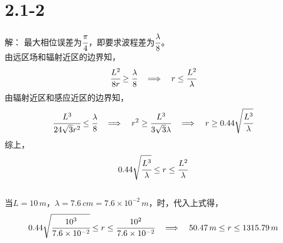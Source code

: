 \documentclass[a4paper,11pt]{article}
\begin{document}
\title{}
\author{\textbf{刘洋} \\ \\ 学号:$201428007326027$ \\
\\$liuyang614@mails.ucas.ac.cn$\\  \\{}}

\date{2015-03-24}
\maketitle

\newpage
\section{2.1-2}
解： 最大相位误差为$\cfrac{\pi}{4}$，即要求波程差为$\cfrac{\lambda}{8}$。\\
由远区场和辐射近区的边界知，
$$\cfrac{L^2}{8r}\geq \cfrac{\lambda}{8}\quad\Longrightarrow \quad  r\leq \cfrac{L^2}{\lambda}$$
由辐射近区和感应近区的边界知，
$$\cfrac{L^3}{24\sqrt{3}r^2}\leq \cfrac{\lambda}{8}\quad\Longrightarrow\quad r^2\geq\cfrac{L^3}{3\sqrt{3}\lambda} \quad \Longrightarrow\quad r\geq 0.44\sqrt{\cfrac{L^3}{\lambda}}$$
综上，$$0.44\sqrt{\cfrac{L^3}{\lambda}}\leq r\leq \cfrac{L^2}{\lambda}$$
\\
当$L=10\, m$，$\lambda=7.6\,cm =7.6\times 10^{-2}\,m$，时，代入上式得，
$$
0.44\sqrt{\cfrac{10^3}{7.6\times10^{-2}}}\leq r\leq \cfrac{10^2}{7.6\times10^{-2}} \quad\Longrightarrow \quad 50.47\,m\leq r\leq 1315.79\,m
$$
\\
\end{document}
